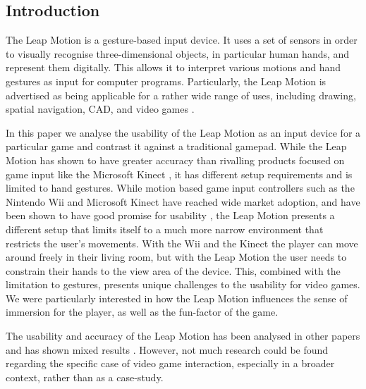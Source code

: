 \subsection{Introduction}
The Leap Motion is a gesture-based input device. It uses a set of sensors in order to visually recognise three-dimensional objects, in particular human hands, and represent them digitally. This allows it to interpret various motions and hand gestures as input for computer programs. Particularly, the Leap Motion is advertised as being applicable for a rather wide range of uses, including drawing, spatial navigation, CAD, and video games \citep{introduction-advertisement}.

In this paper we analyse the usability of the Leap Motion as an input device for a particular game and contrast it against a traditional gamepad. While the Leap Motion has shown to have greater accuracy than rivalling products focused on game input like the Microsoft Kinect \citep{introduction-accuracy}, it has different setup requirements and is limited to hand gestures. While motion based game input controllers such as the Nintendo Wii and Microsoft Kinect have reached wide market adoption, and have been shown to have good promise for usability \citep{introduction-wiikinect}, the Leap Motion presents a different setup that limits itself to a much more narrow environment that restricts the user's movements. With the Wii and the Kinect the player can move around freely in their living room, but with the Leap Motion the user needs to constrain their hands to the view area of the device. This, combined with the limitation to gestures, presents unique challenges to the usability for video games. We were particularly interested in how the Leap Motion influences the sense of immersion for the player, as well as the fun-factor of the game.

The usability and accuracy of the Leap Motion has been analysed in other papers and has shown mixed results \citep{introduction-pointing} \citep{introduction-markerless} \citep{introduction-pointing3d}. However, not much research could be found regarding the specific case of video game interaction, especially in a broader context, rather than as a case-study.

